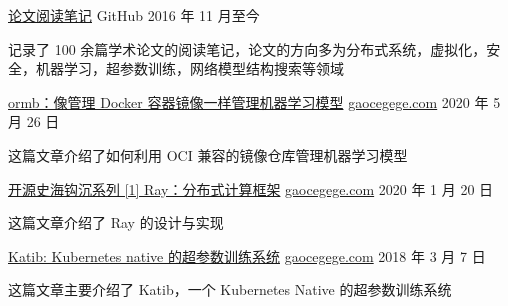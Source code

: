 

\begin{cventries}
  \cventry
    {}
    {\href{https://github.com/gaocegege/papers-notebook}{论文阅读笔记}}
    {GitHub}
    {2016 年 11 月至今}
    {
      \begin{cvitems} %
        \item 记录了 100 余篇学术论文的阅读笔记，论文的方向多为分布式系统，虚拟化，安全，机器学习，超参数训练，网络模型结构搜索等领域
      \end{cvitems}
    }

  \cventry
    {}
    {\href{http://gaocegege.com/Blog/ormb}{ormb：像管理 Docker 容器镜像一样管理机器学习模型}}
    {\href{http://gaocegege.com}{gaocegege.com}}
    {2020 年 5 月 26 日}
    {
      \begin{cvitems} %
        \item {
          这篇文章介绍了如何利用 OCI 兼容的镜像仓库管理机器学习模型
        }
      \end{cvitems}
    }

  \cventry
    {}
    {\href{http://gaocegege.com/Blog/why-do-i-like-ray}{开源史海钩沉系列 [1] Ray：分布式计算框架}}
    {\href{http://gaocegege.com}{gaocegege.com}}
    {2020 年 1 月 20 日}
    {
      \begin{cvitems} %
        \item {
          这篇文章介绍了 Ray 的设计与实现
        }
      \end{cvitems}
    }

  \cventry
    {}
    {\href{http://t.cn/Eh7UCQx}{Katib: Kubernetes native 的超参数训练系统}}
    {\href{http://gaocegege.com}{gaocegege.com}}
    {2018 年 3 月 7 日}
    {
      \begin{cvitems} %
        \item {
          这篇文章主要介绍了 Katib，一个 Kubernetes Native 的超参数训练系统
        }
      \end{cvitems}
    }
\end{cventries}


